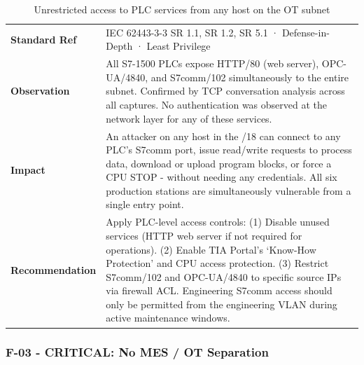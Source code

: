 \begin{table}[H]
\centering
\begin{tabular}{@{}p{}p{}@{}}
\toprule
\textbf{Standard Ref} & IEC 62443-3-3 SR 1.1, SR 1.2, SR 5.1 · Defense-in-Depth · Least Privilege \\
\textbf{Observation} & All S7-1500 PLCs expose HTTP/80 (web server), OPC-UA/4840, and S7comm/102 simultaneously to the entire subnet. Confirmed by TCP conversation analysis across all captures. No authentication was observed at the network layer for any of these services. \\
\textbf{Impact} & An attacker on any host in the /18 can connect to any PLC's S7comm port, issue read/write requests to process data, download or upload program blocks, or force a CPU STOP - without needing any credentials. All six production stations are simultaneously vulnerable from a single entry point. \\
\textbf{Recommendation} & Apply PLC-level access controls: (1) Disable unused services (HTTP web server if not required for operations). (2) Enable TIA Portal's `Know-How Protection' and CPU access protection. (3) Restrict S7comm/102 and OPC-UA/4840 to specific source IPs via firewall ACL. Engineering S7comm access should only be permitted from the engineering VLAN during active maintenance windows. \\
\bottomrule
\end{tabular}
\caption{Unrestricted access to PLC services from any host on the OT subnet}
\end{table}

\subsubsection{F-03 - CRITICAL: No MES / OT Separation}

